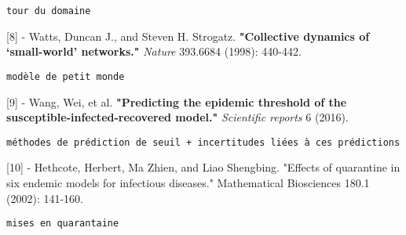 \documentclass{article}
\begin{document}
\begin{verbatim}
tour du domaine
\end{verbatim}


[8] - Watts, Duncan J., and Steven H. Strogatz. \textbf{"Collective dynamics of ‘small-world’ networks."} \textit{Nature} 393.6684 (1998): 440-442.


\begin{verbatim}
modèle de petit monde
\end{verbatim}


[9] - Wang, Wei, et al. \textbf{"Predicting the epidemic threshold of the susceptible-infected-recovered model."} \textit{Scientific reports} 6 (2016).


\begin{verbatim}
méthodes de prédiction de seuil + incertitudes liées à ces prédictions
\end{verbatim}


[10] - Hethcote, Herbert, Ma Zhien, and Liao Shengbing. "Effects of quarantine in six endemic models for infectious diseases." Mathematical Biosciences 180.1 (2002): 141-160.


\begin{verbatim}
mises en quarantaine
\end{verbatim}
\end{document}
